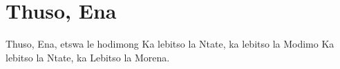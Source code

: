 \starttocol
\chapter{Thuso, Ena}
\nexttocol
\hfill{\it }
\stoptocol
\starttocol
\startlines
{\sc Thuso}, Ena, etswa le hodimong
Ka lebitso la Ntate, ka lebitso la Modimo
Ka lebitso la Ntate, ka Lebitso la Morena.
\stoplines
\nexttocol

\stoptocol
